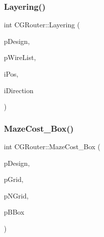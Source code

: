 \mbox{\label{classCGRouter_afc852a0443d502841940332116812f54}} 
\subsubsection{\texorpdfstring{Layering()}{Layering()}\hspace{0.1cm}{\footnotesize\ttfamily [3/3]}}
{\footnotesize\ttfamily int C\+G\+Router\+::\+Layering (\begin{DoxyParamCaption}\item[{\mbox{\hyperlink{classCDesign}{C\+Design}} $\ast$}]{p\+Design,  }\item[{vector$<$ \mbox{\hyperlink{classCWire}{C\+Wire}} $\ast$ $>$ $\ast$}]{p\+Wire\+List,  }\item[{int}]{i\+Pos,  }\item[{int}]{i\+Direction }\end{DoxyParamCaption})\hspace{0.3cm}{\ttfamily [static]}}

\mbox{\label{classCGRouter_a175e2e50a21411c968fdd51eb280615a}} 
\subsubsection{\texorpdfstring{MazeCost\_Box()}{MazeCost\_Box()}}
{\footnotesize\ttfamily int C\+G\+Router\+::\+Maze\+Cost\+\_\+\+Box (\begin{DoxyParamCaption}\item[{\mbox{\hyperlink{classCDesign}{C\+Design}} $\ast$}]{p\+Design,  }\item[{\mbox{\hyperlink{classCGrid}{C\+Grid}} $\ast$}]{p\+Grid,  }\item[{\mbox{\hyperlink{classCGrid}{C\+Grid}} $\ast$}]{p\+N\+Grid,  }\item[{\mbox{\hyperlink{classCBBox}{C\+B\+Box}} $\ast$}]{p\+B\+Box }\end{DoxyParamCaption})\hspace{0.3cm}{\ttfamily [static]}}

\mbox{\label{classCGRouter_ab46ca3eeaf6b0e08300d4fd6c067bb03}} 
